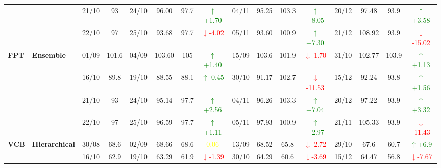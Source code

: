 \documentclass{ieeeaccess}
\begin{document}
{\begin{longtable}{llcc|cccc|cccc|cccc}
&
& 21/10 & 93 & 24/10 & 96.00 & 97.7 & \textcolor{green}{\(\uparrow\)+1.70} & 04/11 & 95.25 & 103.3 & \textcolor{green}{\(\uparrow\)+8.05} & 20/12 & 97.48 & 93.9 & \textcolor{green}{\(\uparrow\)+3.58} \\

&
& 22/10 & 97 & 25/10 & 93.68 & 97.7 & \textcolor{red}{\(\downarrow\)-4.02} & 05/11 & 93.60 & 100.9 & \textcolor{green}{\(\uparrow\)+7.30} & 21/12 & 108.92 & 93.9 & \textcolor{red}{\(\downarrow\)-15.02} \\
\midrule



\multirow{4}{*}{\textbf{FPT}} 
& \textbf{Ensemble}
& 01/09 & 101.6 & 04/09 & 103.60 & 105 & \textcolor{green}{\(\uparrow\)+1.40} & 15/09 & 103.6 & 101.9 & \textcolor{red}{\(\downarrow\)-1.70} & 31/10 & 102.77 & 103.9 & \textcolor{green}{\(\uparrow\)+1.13} \\

&
& 16/10 & 89.8 & 19/10 & 88.55 & 88.1 & \textcolor{green}{\(\uparrow\)-0.45} & 30/10 & 91.17 & 102.7 & \textcolor{red}{\(\downarrow\)-11.53} & 15/12 & 92.24 & 93.8 & \textcolor{green}{\(\uparrow\)+1.56} \\

&
& 21/10 & 93 & 24/10 & 95.14 & 97.7 & \textcolor{green}{\(\uparrow\)+2.56} & 04/11 & 96.26 & 103.3 & \textcolor{green}{\(\uparrow\)+7.04} & 20/12 & 97.22 & 93.9 & \textcolor{green}{\(\uparrow\)+3.32} \\

&
& 22/10 & 97 & 25/10 & 96.59 & 97.7 & \textcolor{green}{\(\uparrow\)+1.11} & 05/11 & 97.93 & 100.9 & \textcolor{green}{\(\uparrow\)+2.97} & 21/11 & 105.33 & 93.9 & \textcolor{red}{\(\downarrow\)-11.43} \\
\midrule




\multirow{4}{*}{\textbf{VCB}} 
& \textbf{Hierarchical}
& 30/08 & 68.6 & 02/09 & 68.66 & 68.6 & \textcolor{yellow}{0.06} & 13/09 & 68.52 & 65.8 & \textcolor{red}{\(\downarrow\)-2.72} & 29/10 & 67.6 & 60.7 & \textcolor{green}{\(\uparrow\)+6.9} \\

&
& 16/10 & 62.9 & 19/10 & 63.29 & 61.9 & \textcolor{red}{\(\downarrow\)-1.39} & 30/10 & 64.29 & 60.6 & \textcolor{red}{\(\downarrow\)-3.69} & 15/12 & 64.47 & 56.8 & \textcolor{red}{\(\downarrow\)-7.67} \\


\end{longtable}}
\end{document}
